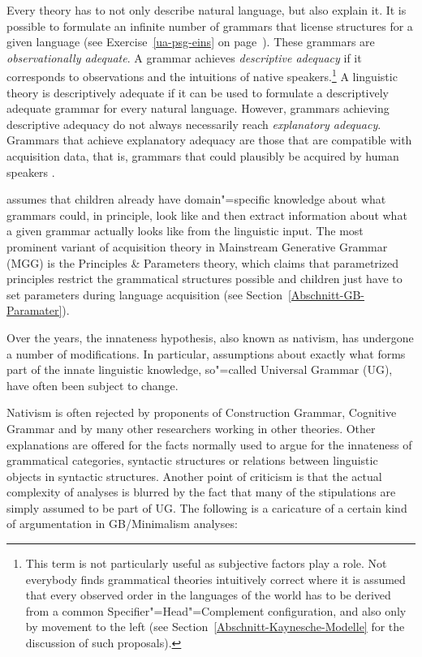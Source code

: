 Every theory has to not only describe natural language, but also explain it. It is possible to
formulate an infinite number of grammars that license structures for a given language (see Exercise~\ref{ua-psg-eins} on page~\pageref{ua-psg-eins}). These grammars are \emph{observationally adequate}.
A grammar achieves \emph{descriptive adequacy} if it corresponds to observations and the intuitions of native speakers.\footnote{%
This term is not particularly useful as subjective factors play a role. Not everybody finds grammatical theories intuitively correct where it is assumed that every
observed order in the languages of the world has to be derived from a common
Specifier"=Head"=Complement configuration, and also only by movement to the left (see Section~\ref{Abschnitt-Kaynesche-Modelle} for the discussion of such proposals).
}
A linguistic theory is descriptively adequate if it can be used to formulate a descriptively adequate grammar for every natural language. However, grammars achieving descriptive
adequacy do not always necessarily reach \emph{explanatory adequacy}. Grammars that achieve explanatory adequacy are those that are compatible with
acquisition data, that is, grammars that could plausibly be acquired by human speakers \citep[--25]{Chomsky65a}.

\citet[]{Chomsky65a} assumes that children already have domain"=specific knowledge about
what grammars could, in principle, look like and then extract information about what a given grammar
actually looks like from the linguistic input. The most prominent variant of acquisition theory in
Mainstream Generative Grammar (MGG) is the Principles \& Parameters theory, which claims that
parametrized principles restrict the grammatical structures possible and children just have to set
parameters during language acquisition (see Section~\ref{Abschnitt-GB-Paramater}).

Over the years, the innateness hypothesis, also known as nativism, has undergone a number of modifications.
In particular, assumptions about exactly what forms part of the innate linguistic knowledge,
so"=called Universal Grammar (UG), have often been subject to change.

Nativism is often rejected by proponents of Construction Grammar\indexcxg, Cognitive
Grammar and by many other researchers working in other theories. Other
explanations are offered for the facts normally used to argue for the innateness of grammatical
categories, syntactic structures or relations between linguistic objects in syntactic structures.
Another point of criticism is that the actual complexity of analyses is blurred by the fact that
many of the stipulations are simply assumed to be part of UG.
The following is a caricature of a certain kind of argumentation in GB/Minimalism analyses:


